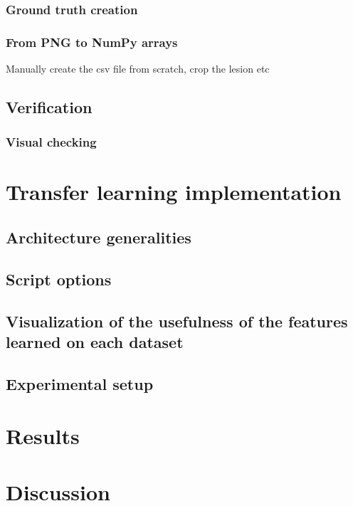 \subsubsection{Ground truth creation}
\subsubsection{From PNG to NumPy arrays}
Manually create the csv file from scratch, crop the lesion etc

\subsection{Verification}
\subsubsection{Visual checking}

\section{Transfer learning implementation}
\subsection{Architecture generalities}
\subsection{Script options}
\subsection{Visualization of the usefulness of the features learned on each dataset}
\subsection{Experimental setup}
\section{Results}

\section{Discussion}